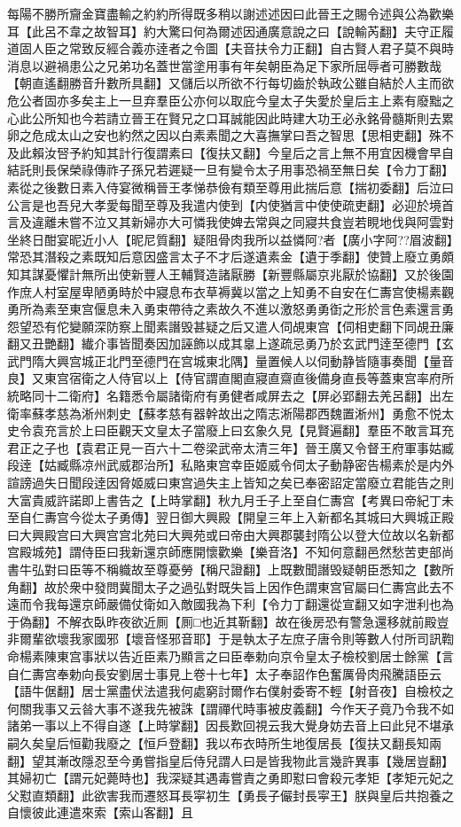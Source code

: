 每陽不勝所齎金寶盡輸之約約所得既多稍以謝述述因曰此晉王之賜令述與公為歡樂耳【此呂不韋之故智耳】約大驚曰何為爾述因通廣意說之曰【說輸芮翻】夫守正履道固人臣之常致反經合義亦逹者之令圖【夫音扶令力正翻】自古賢人君子莫不與時消息以避禍患公之兄弟功名蓋世當塗用事有年矣朝臣為足下家所屈辱者可勝數哉【朝直遙翻勝音升數所具翻】又儲后以所欲不行每切齒於執政公雖自結於人主而欲危公者固亦多矣主上一旦弃羣臣公亦何以取庇今皇太子失愛於皇后主上素有廢黜之心此公所知也今若請立晉王在賢兄之口耳誠能因此時建大功王必永銘骨髓斯則去累卵之危成太山之安也約然之因以白素素聞之大喜撫掌曰吾之智思【思相吏翻】殊不及此賴汝唘予約知其計行復謂素曰【復扶又翻】今皇后之言上無不用宜因機會早自結託則長保榮祿傳祚子孫兄若遲疑一旦有變令太子用事恐禍至無日矣【令力丁翻】素從之後數日素入侍宴微稱晉王孝悌恭儉有類至尊用此揣后意【揣初委翻】后泣曰公言是也吾兒大孝愛每聞至尊及我遣内使到【内使猶言中使使疏吏翻】必迎於境首言及違離未嘗不泣又其新婦亦大可憐我使婢去常與之同寢共食豈若睍地伐與阿雲對坐終日酣宴昵近小人【昵尼質翻】疑阻骨肉我所以益憐阿?者【廣小字阿??眉波翻】常恐其潛殺之素既知后意因盛言太子不才后遂遺素金【遺于季翻】使贊上廢立勇頗知其謀憂懼計無所出使新豐人王輔賢造諸厭勝【新豐縣屬京兆厭於協翻】又於後園作庶人村室屋卑陋勇時於中寢息布衣草褥冀以當之上知勇不自安在仁夀宫使楊素觀勇所為素至東宫偃息未入勇束帶待之素故久不進以激怒勇勇衘之形於言色素還言勇怨望恐有佗變願深防察上聞素譖毁甚疑之后又遣人伺覘東宫【伺相吏翻下同覘丑廉翻又丑艷翻】纎介事皆聞奏因加誣飾以成其辠上遂疏忌勇乃於玄武門逹至德門【玄武門隋大興宫城正北門至德門在宫城東北隅】量置候人以伺動静皆隨事奏聞【量音良】又東宫宿衛之人侍官以上【侍官謂直閣直寢直齋直後備身直長等蓋東宫率府所統略同十二衛府】名籍悉令屬諸衛府有勇健者咸屏去之【屏必郢翻去羌呂翻】出左衛率蘇孝慈為淅州刺史【蘇孝慈有器幹故出之隋志淅陽郡西魏置淅州】勇愈不悦太史令袁充言於上曰臣觀天文皇太子當廢上曰玄象久見【見賢遍翻】羣臣不敢言耳充君正之子也【袁君正見一百六十二卷梁武帝太清三年】晉王廣又令督王府軍事姑臧段逹【姑臧縣凉州武威郡治所】私賂東宫幸臣姬威令伺太子動静密告楊素於是内外諠謗過失日聞段逹因脅姬威曰東宫過失主上皆知之矣已奉密詔定當廢立君能告之則大富貴威許諾即上書告之【上時掌翻】秋九月壬子上至自仁夀宫【考異曰帝紀丁未至自仁夀宫今從太子勇傳】翌日御大興殿【開皇三年上入新都名其城曰大興城正殿曰大興殿宫曰大興宫宫北苑曰大興苑或曰帝由大興郡襲封隋公以登大位故以名新都宫殿城苑】謂侍臣曰我新還京師應開懷歡樂【樂音洛】不知何意翻邑然愁苦吏部尚書牛弘對曰臣等不稱軄故至尊憂勞【稱尺證翻】上既數聞譖毁疑朝臣悉知之【數所角翻】故於衆中發問冀聞太子之過弘對既失旨上因作色謂東宫官屬曰仁夀宫此去不遠而令我每還京師嚴備仗衛如入敵國我為下利【令力丁翻還從宣翻又如字泄利也為于偽翻】不解衣臥昨夜欲近厠【厠□也近其靳翻】故在後房恐有警急還移就前殿豈非爾輩欲壞我家國邪【壞音怪邪音耶】于是執太子左庶子唐令則等數人付所司訊鞫命楊素陳東宫事狀以告近臣素乃顯言之曰臣奉勅向京令皇太子檢校劉居士餘黨【言自仁夀宫奉勅向長安劉居士事見上卷十七年】太子奉詔作色奮厲骨肉飛騰語臣云【語牛倨翻】居士黨盡伏法遣我何處窮討爾作右僕射委寄不輕【射音夜】自檢校之何關我事又云㫺大事不遂我先被誅【謂禪代時事被皮義翻】今作天子竟乃令我不如諸弟一事以上不得自遂【上時掌翻】因長歎回視云我大覺身妨去音上曰此兒不堪承嗣久矣皇后恒勸我廢之【恒戶登翻】我以布衣時所生地復居長【復扶又翻長知兩翻】望其漸改隱忍至今勇嘗指皇后侍兒謂人曰是皆我物此言幾許異事【幾居豈翻】其婦初亡【謂元妃薨時也】我深疑其遇毒嘗責之勇即懟曰會殺元孝矩【孝矩元妃之父懟直類翻】此欲害我而遷怒耳長寜初生【勇長子儼封長寜王】朕與皇后共抱養之自懷彼此連遣來索【索山客翻】且